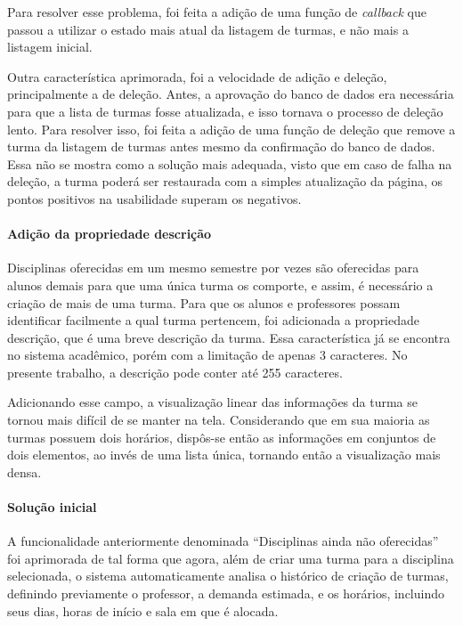 Para resolver esse problema, foi feita a adição de uma função de \textit{callback} que passou a utilizar o estado mais atual da listagem de turmas, e não mais a listagem inicial.

Outra característica aprimorada, foi a velocidade de adição e deleção, principalmente a de deleção. Antes, a aprovação do banco de dados era necessária para que a lista de turmas fosse atualizada, e isso tornava o processo de deleção lento. Para resolver isso, foi feita a adição de uma função de deleção que remove a turma da listagem de turmas antes mesmo da confirmação do banco de dados. Essa não se mostra como a solução mais adequada, visto que em caso de falha na deleção, a turma poderá ser restaurada com a simples atualização da página, os pontos positivos na usabilidade superam os negativos.

\paragraph*{Adição da propriedade descrição}

Disciplinas oferecidas em um mesmo semestre por vezes são oferecidas para alunos demais para que uma única turma os comporte, e assim, é necessário a criação de mais de uma turma. Para que os alunos e professores possam identificar facilmente a qual turma pertencem, foi adicionada a propriedade descrição, que é uma breve descrição da turma. Essa característica já se encontra no sistema acadêmico, porém com a limitação de apenas 3 caracteres. No presente trabalho, a descrição pode conter até 255 caracteres.

Adicionando esse campo, a visualização linear das informações da turma se tornou mais difícil de se manter na tela. Considerando que em sua maioria as turmas possuem dois horários, dispôs-se então as informações em conjuntos de dois elementos, ao invés de uma lista única, tornando então a visualização mais densa.

\paragraph*{Solução inicial}

A funcionalidade anteriormente denominada ``Disciplinas ainda não oferecidas'' foi aprimorada de tal forma que agora, além de criar uma turma para a disciplina selecionada, o sistema automaticamente analisa o histórico de criação de turmas, definindo previamente o professor, a demanda estimada, e os horários, incluindo seus dias, horas de início e sala em que é alocada.

